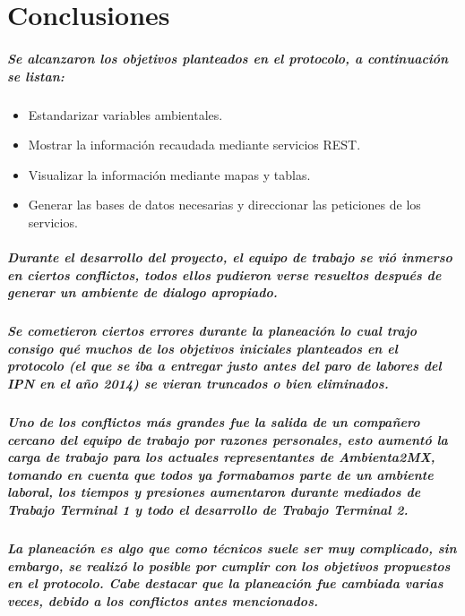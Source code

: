 \chapter {Conclusiones}
  \paragraph{Se alcanzaron los objetivos planteados en el protocolo, a continuación se listan:}
  \begin{itemize}
    \item Estandarizar variables ambientales.
    \item Mostrar la información recaudada mediante servicios REST.
    \item Visualizar la información mediante mapas y tablas.
    \item Generar las bases de datos necesarias y direccionar las peticiones de los servicios.
  \end{itemize}
  \paragraph{Durante el desarrollo del proyecto, el equipo de trabajo se vió inmerso en ciertos conflictos, todos ellos pudieron verse resueltos después de generar un ambiente de dialogo apropiado.}
  \paragraph{Se cometieron ciertos errores durante la planeación lo cual trajo consigo qué muchos de los objetivos iniciales planteados en el protocolo (el que se iba a entregar justo antes del paro de labores del IPN en el año 2014) se vieran truncados o bien eliminados.}
  \paragraph{Uno de los conflictos más grandes fue la salida de un compañero cercano del equipo de trabajo por razones personales, esto aumentó la carga de trabajo para los actuales representantes de Ambienta2MX, tomando en cuenta que todos ya formabamos parte de un ambiente laboral, los tiempos y presiones aumentaron durante mediados de Trabajo Terminal 1 y todo el desarrollo de Trabajo Terminal 2.}
  \paragraph{La planeación es algo que como técnicos suele ser muy complicado, sin embargo, se realizó lo posible por cumplir con los objetivos propuestos en el protocolo. Cabe destacar que la planeación fue cambiada varias veces, debido a los conflictos antes mencionados.}
